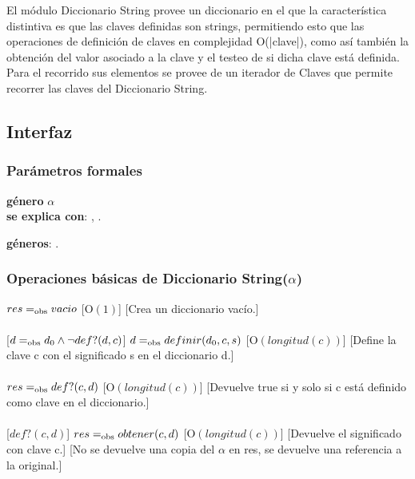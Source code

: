 El m\'odulo Diccionario String provee un diccionario en el que la caracter\'istica distintiva es que las claves definidas son strings, permitiendo esto que las operaciones de definici\'on de claves en complejidad O(|clave|), como as\'i tambi\'en la obtenci\'on del valor asociado a la clave y el testeo de si dicha clave est\'a definida.
Para el recorrido sus elementos se provee de un iterador de Claves que permite recorrer las claves del Diccionario String.

\subsection{Interfaz}

  \subsubsection{Par\'ametros formales}
	\textbf{g\'enero} $\alpha$\\
  \textbf{se explica con}: , .

  \textbf{g\'eneros}: . %

  \subsubsection{Operaciones b\'asicas de Diccionario String($\alpha$)}
  {$res =_{\mathrm{obs}} vacio$}%
  [O$(1)$]
  [Crea un diccionario vac\'io.]\\\\
  [$d =_{\mathrm{obs}} d_0 \wedge \neg def?(d,c)$]
  {$d =_{\mathrm{obs}} definir(d_0,c,s)$}%
  [O$(longitud(c))$]
  [Define la clave c con el significado s en el diccionario d.]\\\\
  {$res =_{\mathrm{obs}} def?(c,d)$}%
  [O$(longitud(c))$]
  [Devuelve true si y solo si c est\'a definido como clave en el diccionario.]\\\\
  [$def?(c,d)$]
  {$res =_{\mathrm{obs}} obtener(c,d)$}%
  [O$(longitud(c))$]
  [Devuelve el significado con clave c.]
  [No se devuelve una copia del $\alpha$ en res, se devuelve una referencia a la original.]\\\\

